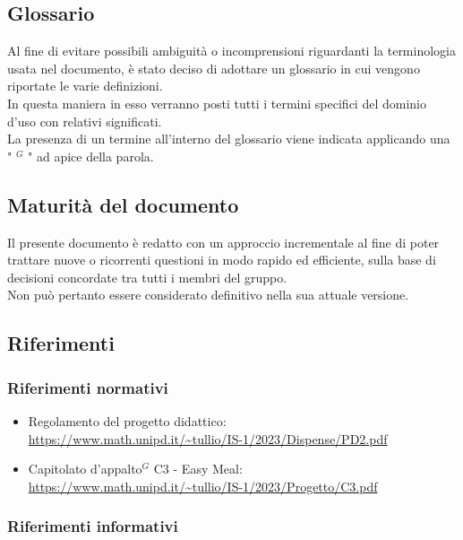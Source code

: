     \subsection{Glossario}

    Al fine di evitare possibili ambiguità o incomprensioni riguardanti la terminologia usata nel documento, è stato deciso di adottare un glossario in cui vengono riportate le varie definizioni.  \\
    In questa maniera in esso verranno posti tutti i termini specifici del dominio d’uso con relativi significati. \\
    La presenza di un termine all’interno del glossario viene indicata applicando una " $^{G}$ " ad apice della parola.


    \subsection{Maturità del documento}

    Il presente documento è redatto con un approccio incrementale al fine di poter trattare nuove o ricorrenti questioni in modo rapido ed efficiente, sulla base di decisioni concordate tra tutti i membri del gruppo.  \\
    Non può pertanto essere considerato definitivo nella sua attuale versione.

    \subsection{Riferimenti}

        \subsubsection{Riferimenti normativi}

        \begin{itemize}
            \item Regolamento del progetto didattico: \\
            \url{https://www.math.unipd.it/~tullio/IS-1/2023/Dispense/PD2.pdf}
            \item Capitolato d’appalto$^{G}$ C3 - Easy Meal: \\
            \url{https://www.math.unipd.it/~tullio/IS-1/2023/Progetto/C3.pdf}
        \end{itemize}
        


        \subsubsection{Riferimenti informativi}
